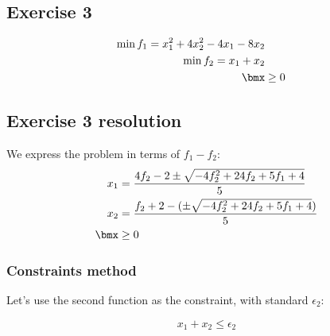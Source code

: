 \documentclass[\main/main.tex]{subfiles}
\begin{document}
\subsection{Exercise 3}
\begin{align*}
  \min f_1 = x^2_1 + 4x^2_2 -4x_1 -8x_2 \\
  \min f_2 = x_1+x_2                    \\
  \bmx & \geq 0
\end{align*}


\subsection{Exercise 3 resolution}
We express the problem in terms of $f_1-f_2$:
\begin{align*}
  x_1  & = \frac{4 f_2  - 2\pm \sqrt{-4 f_2^2 + 24 f_2 + 5 f_1 + 4}}{5}  \\
  x_2  & = \frac{f_2+ 2 -( \pm \sqrt{-4 f_2^2 + 24 f_2 + 5 f_1 + 4})}{5} \\
  \bmx & \geq 0
\end{align*}


\subsubsection*{Constraints method}
Let's use the second function as the constraint, with standard $\epsilon_2$:

\[
  x_1+x_2 \leq \epsilon_2
\]
\end{document}
